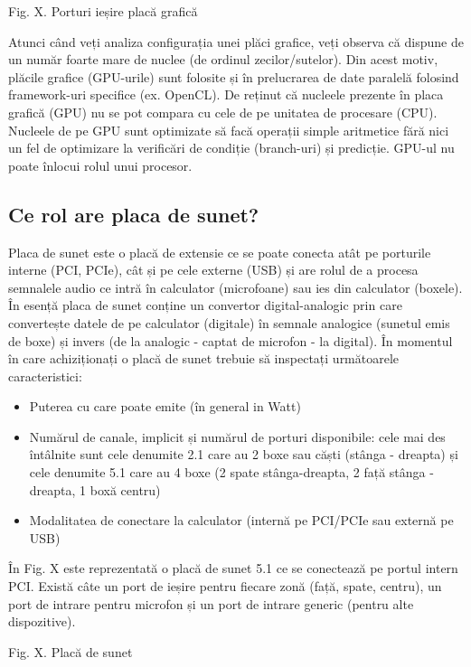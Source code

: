 Fig. X. Porturi ieșire placă grafică


Atunci când veți analiza configurația unei plăci grafice, veți observa că
dispune de un număr foarte mare de nuclee (de ordinul zecilor/sutelor). Din
acest motiv, plăcile grafice (GPU-urile) sunt folosite și în prelucrarea de date
paralelă folosind framework-uri specifice (ex. OpenCL). De reținut că nucleele
prezente în placa grafică (GPU) nu se pot compara cu cele de pe unitatea de
procesare (CPU). Nucleele de pe GPU sunt optimizate să facă operații simple
aritmetice fără nici un fel de optimizare la verificări de condiție (branch-uri)
și predicție. GPU-ul nu poate înlocui rolul unui procesor.

\subsection{Ce rol are placa de sunet?}
\label{sec:hardware-extensii-audio}

Placa de sunet este o placă de extensie ce se poate conecta atât pe porturile
interne (PCI, PCIe), cât și pe cele externe (USB) și are rolul de a procesa
semnalele audio ce intră în calculator (microfoane) sau ies din calculator
(boxele). În esență placa de sunet conține un convertor digital-analogic prin
care convertește datele de pe calculator (digitale) în semnale analogice
(sunetul emis de boxe) și invers (de la analogic - captat de microfon - la
digital). În momentul în care achiziționați o placă de sunet trebuie să
inspectați următoarele caracteristici:

\begin{itemize}
	\item Puterea cu care poate emite (în general in Watt)
	\item Numărul de canale, implicit și numărul de porturi disponibile:
		cele mai des întâlnite sunt cele denumite 2.1 care au 2 boxe sau
		căști (stânga - dreapta) și cele denumite 5.1 care au 4 boxe (2
		spate stânga-dreapta, 2 față stânga -dreapta, 1 boxă centru)
	\item Modalitatea de conectare la calculator (internă pe PCI/PCIe sau
		externă pe USB)
\end{itemize}

În Fig. X este reprezentată o placă de sunet 5.1 ce se conectează pe portul
intern PCI. Există câte un port de ieșire pentru fiecare zonă (față, spate,
centru), un port de intrare pentru microfon și un port de intrare generic
(pentru alte dispozitive).

Fig. X. Placă de sunet


